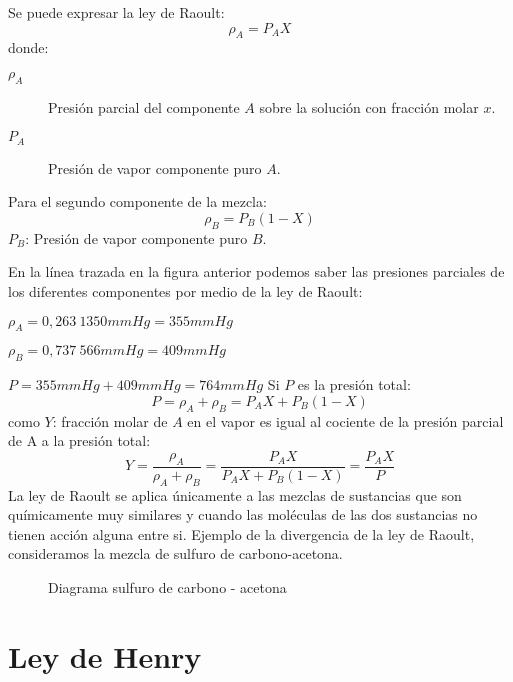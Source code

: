 \documentclass[11pt,openany]{book}
\begin{document}
 Se puede expresar la ley de Raoult:
\begin{equation}
 \boxed {\rho_A=P_A X}
\end{equation}
  donde:
  \begin{description}
  \item [$\rho_A$] {Presión parcial del componente $A$ sobre la solución con fracción molar $x$.} 
  \item [$P_A$] {Presión de vapor componente puro $A$.}
  \end{description}


  Para el segundo componente de la mezcla:
   \begin{equation}
   \boxed{\rho_B=P_B (1-X)}
   \end{equation}
  $P_B$: Presión de vapor componente puro $B$.

En la línea trazada en la figura anterior podemos saber las presiones parciales de los diferentes
 componentes por medio de la ley de Raoult:

$\rho_A=0,263\ 1350mmHg = 355mmHg$

$\rho_B= 0,737\ 566mmHg = 409mmHg$

$P = 355mmHg + 409mmHg = 764 mmHg$ 
Si $P$ es la presión total:
\begin{equation}
\boxed{P=\rho_A + \rho_B = P_A X+P_B (1-X)}
\end{equation}
como $Y$: fracción molar de $A$ en el vapor es igual al cociente de la presión parcial de A a la presión total:
\begin{equation}
\boxed{Y=\frac{\rho_A}{\rho_A+\rho_B}=\frac{P_A X}{P_A X+P_B (1-X)}=\frac{P_A X}{P}}
\end{equation}
La ley de Raoult se aplica únicamente a las mezclas de sustancias que son químicamente muy similares 
y cuando las moléculas de las dos sustancias no tienen acción alguna entre si. Ejemplo de la 
divergencia de la ley de Raoult, consideramos la mezcla de sulfuro de carbono-acetona.

\begin{figure}[h]
  \centering
  
  \caption{Diagrama sulfuro de carbono - acetona}  
\end{figure}
 

\section{Ley de Henry}
\end{document}
